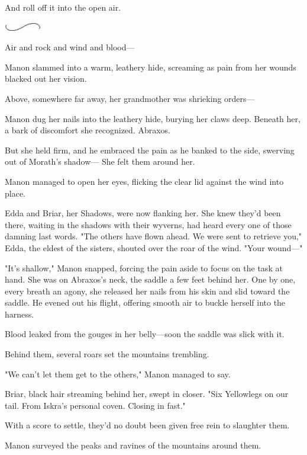 And roll off it into the open air.

\begin{center}
	\includegraphics[width=0.65in,height=0.13in]{images/seperator}
\end{center}

Air and rock and wind and blood---

Manon slammed into a warm, leathery hide, screaming as pain from her wounds blacked out her vision.

Above, somewhere far away, her grandmother was shrieking orders---

Manon dug her nails into the leathery hide, burying her claws deep.
Beneath her, a bark of discomfort she recognized.
Abraxos.

But she held firm, and he embraced the pain as he banked to the side, swerving out of Morath's shadow--- She felt them around her.

Manon managed to open her eyes, flicking the clear lid against the wind into place.

Edda and Briar, her Shadows, were now flanking her.
She knew they'd been there, waiting in the shadows with their wyverns, had heard every one of those damning last words.
"The others have flown ahead.
We were sent to retrieve you," Edda, the eldest of the sisters, shouted over the roar of the wind.
"Your wound---"

"It's shallow," Manon snapped, forcing the pain aside to focus on the task at hand.
She was on Abraxos's neck, the saddle a few feet behind her.
One by one, every breath an agony, she released her nails from his skin and slid toward the saddle.
He evened out his flight, offering smooth air to buckle herself into the harness.

Blood leaked from the gouges in her belly---soon the saddle was slick with it.

Behind them, several roars set the mountains trembling.

"We can't let them get to the others," Manon managed to say.

Briar, black hair streaming behind her, swept in closer.
"Six Yellowlegs on our tail.
From Iskra's personal coven.
Closing in fast."

With a score to settle, they'd no doubt been given free rein to slaughter them.

Manon surveyed the peaks and ravines of the mountains around them.

